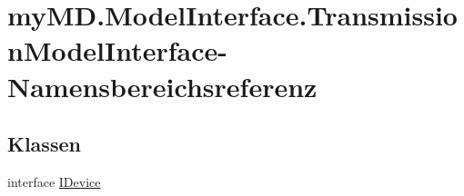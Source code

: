 \hypertarget{namespacemy_m_d_1_1_model_interface_1_1_transmission_model_interface}{}\section{my\+M\+D.\+Model\+Interface.\+Transmission\+Model\+Interface-\/\+Namensbereichsreferenz}
\label{namespacemy_m_d_1_1_model_interface_1_1_transmission_model_interface}
\subsection*{Klassen}
\begin{DoxyCompactItemize}
\item 
interface \mbox{\hyperlink{interfacemy_m_d_1_1_model_interface_1_1_transmission_model_interface_1_1_i_device}{I\+Device}}
\end{DoxyCompactItemize}
